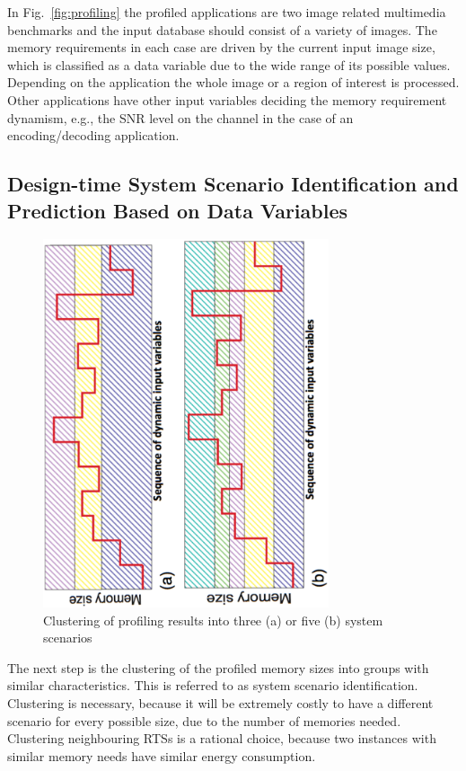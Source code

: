 \documentclass[smallextended]{svjour3}
\begin{document}
In Fig.~\ref{fig:profiling} the profiled applications are two image related multimedia benchmarks and the input database should consist of a variety of images. 
The memory requirements in each case are driven by the current input image size, which is classified as a data variable due to the wide range of its possible values. 
Depending on the application the whole image or a region of interest is processed. 
Other applications have other input variables deciding the memory requirement dynamism, e.g., the SNR level on the channel in the case of an encoding/decoding application.

\subsection{Design-time System Scenario Identification and Prediction Based on Data Variables}

\begin{figure}
\centering
\includegraphics[angle=270, width=0.75\textwidth]{Images/1Dclustering.ps}
\caption{Clustering of profiling results into three (a) or five (b) system scenarios}
\label{fig:clustering}
\end{figure}

The next step is the clustering of the profiled memory sizes into groups with similar characteristics. 
This is referred to as system scenario identification. 
Clustering is necessary, because it will be extremely costly to have a different scenario for every possible size, due to the number of memories needed. 
Clustering neighbouring RTSs is a rational choice, because two instances with similar memory needs have similar energy consumption. 
\end{document}
